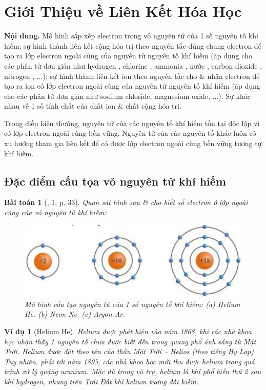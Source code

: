\documentclass{article}
\newtheorem{baitoan}{Bài toán}
\newtheorem{vidu}{Ví dụ}
\begin{document}
\section{Giới Thiệu về Liên Kết Hóa Học}
\textsf{\textbf{Nội dung.} Mô hình sắp xếp electron trong vỏ nguyên tử của 1 số nguyên tố khí hiếm; sự hình thành liên kết cộng hóa trị theo nguyên tắc dùng chung electron để tạo ra lớp electron ngoài cùng của nguyên tử nguyên tố khí hiếm (áp dụng cho các phân tử đơn giản như hydrogen , chlorine , ammonia , nước , carbon dioxide , nitrogen , $\ldots$); sự hình thành liên kết ion theo nguyên tắc cho \& nhận electron để tạo ra ion có lớp electron ngoài cùng của nguyên tử nguyên tố khí hiếm (áp dụng cho các phân tử đơn giản như sodium chloride, magnesium oxide, $\ldots$). Sự khác nhau về 1 số tính chất của chất ion \& chất cộng hóa trị.}

Trong điều kiện thường, nguyên tử của các nguyên tố khí hiếm tồn tại độc lập vì có lớp electron ngoài cùng bền vững. Nguyên tử của các nguyên tố khác luôn có xu hướng tham gia liên kết để có được lớp electron ngoài cùng bền vững tương tự khí hiếm.

\subsection{Đặc điểm cấu tọa vỏ nguyên tử khí hiếm}

\begin{baitoan}[\cite{SGK_KHTN_7_Canh_Dieu}, 1, p. 33]
	Quan sát hình sau \& cho biết số electron ở lớp ngoài cùng của vỏ nguyên tử khí hiếm:
	\begin{figure}[H]
		\centering
		\includegraphics[scale=0.3]{helium_neon_argon}
		\caption{Mô hình cấu tạo nguyên tử của 1 số nguyên tố khí hiếm: (a) Helium He. (b) Neon Ne. (c) Argon Ar.}
	\end{figure}
\end{baitoan}

\begin{vidu}[Helium He]
	Helium được phát hiện vào năm 1868, khi các nhà khoa học nhận thấy 1 nguyên tố chưa được biết đến trong quang phổ ánh sáng từ Mặt Trời. Helium được đặt theo tên của thần Mặt Trời -- Helios (theo tiếng Hy Lạp). Tuy nhiên, phải tới năm 1895, các nhà khoa học mới thu được helium trong quá trình xử lý quặng uranium. Mặc dù trong vũ trụ, helium là khí phổ biến thứ 2 sau khí hydrogen, nhưng trên Trái Đất khí helium tương đối hiếm.
\end{vidu}
\end{document}
